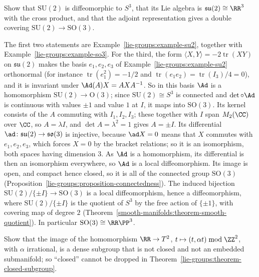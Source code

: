 \begin{exercise}\label{lie-groups:exercise-su2}
Show that $\mathrm{SU}(2)$ is diffeomorphic to $S^3$, that its Lie algebra is $\mathfrak{su}(2) \cong \RR^3$ with the cross product, and that the adjoint representation gives a double covering
$\mathrm{SU}(2) \to \mathrm{SO}(3)$.
\end{exercise}

\begin{solution}
The first two statements are Example~\ref{lie-groups:example-su2}, together with Example~\ref{lie-groups:example-so3}. For the third, the form
$\langle X, Y\rangle = -2\operatorname{tr}(XY)$ on $\mathfrak{su}(2)$ makes the basis $e_1, e_2, e_3$ of Example~\ref{lie-groups:example-su2} orthonormal
(for instance $\operatorname{tr}(e_1^2) = -1/2$ and $\operatorname{tr}(e_1e_2) = \operatorname{tr}(I_3)/4 = 0$), and it is invariant under
$\Ad(A)X = AXA^{-1}$. So in this basis $\Ad$ is a homomorphism $\mathrm{SU}(2) \to \mathrm{O}(3)$; since $\mathrm{SU}(2) \cong S^3$ is connected and
$\det \circ \Ad$ is continuous with values $\pm 1$ and value $1$ at $I$, it maps into $\mathrm{SO}(3)$. Its kernel consists of the $A$ commuting with
$I_1, I_2, I_3$; these together with $I$ span $M_2(\CC)$ over $\CC$, so $A = \lambda I$, and $\det A = \lambda^2 = 1$ gives $A = \pm I$. Its differential
$\ad \colon \mathfrak{su}(2) \to \mathfrak{so}(3)$ is injective, because $\ad X = 0$ means that $X$ commutes with $e_1, e_2, e_3$, which forces $X = 0$ by the
bracket relations; so it is an isomorphism, both spaces having dimension $3$. As $\Ad$ is a homomorphism, its differential is then an isomorphism everywhere,
so $\Ad$ is a local diffeomorphism. Its image is open, and compact hence closed, so it is all of the connected group $\mathrm{SO}(3)$
(Proposition~\ref{lie-groups:proposition-connectedness}). The induced bijection $\mathrm{SU}(2)/\{\pm I\} \to \mathrm{SO}(3)$ is a local diffeomorphism, hence a
diffeomorphism, where $\mathrm{SU}(2)/\{\pm I\}$ is the quotient of $S^3$ by the free action of $\{\pm 1\}$, with covering map of degree $2$
(Theorem~\ref{smooth-manifolds:theorem-smooth-quotient}). In particular $\mathrm{SO}(3) \cong \RR\PP^3$.
\end{solution}

\begin{exercise}\label{lie-groups:exercise-closed-subgroup-needed}
Show that the image of the homomorphism $\RR \to T^2$, $t \mapsto (t, \alpha t) \bmod \ZZ^2$, with $\alpha$ irrational, is a dense subgroup that is not closed and not an embedded submanifold; so
``closed'' cannot be dropped in Theorem~\ref{lie-groups:theorem-closed-subgroup}.
\end{exercise}

